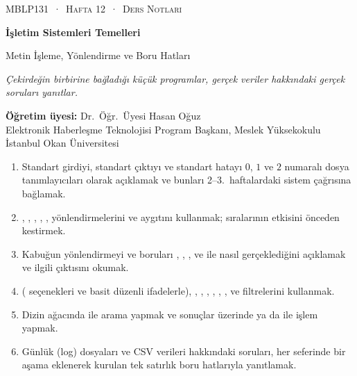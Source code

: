\setlength{\emergencystretch}{3em}
\thispagestyle{empty}
\begin{tcolorbox}[enhanced,colback=dark,colframe=dark,arc=0pt,boxrule=0pt,
  left=18pt,right=18pt,top=20pt,bottom=20pt,coltext=white]
{\small\color{mint}\textsc{MBLP131 \,·\, Hafta 12 \,·\, Ders Notları}}\par\medskip
{\headfont\fontsize{26}{30}\selectfont\bfseries İşletim Sistemleri Temelleri}\par\medskip
{\large Metin İşleme, Yönlendirme ve Boru Hatları}\par\smallskip
{\small\itshape\color{white!70} Çekirdeğin birbirine bağladığı küçük programlar, gerçek veriler hakkındaki gerçek soruları yanıtlar.}
\end{tcolorbox}

\vspace{0.4em}
\begin{minipage}[t]{0.70\linewidth}
\small
\textbf{Öğretim üyesi:} Dr.\ Öğr.\ Üyesi Hasan Oğuz\\
Elektronik Haberleşme Teknolojisi Program Başkanı, Meslek Yüksekokulu\\
İstanbul Okan Üniversitesi
\end{minipage}

\vspace{0.8em}
\begin{keyidea}
\begin{enumerate}[leftmargin=1.4em]
  \item Standart girdiyi, standart çıktıyı ve standart hatayı $0$, $1$ ve $2$ numaralı dosya tanımlayıcıları olarak açıklamak ve bunları 2--3.~haftalardaki  sistem çağrısına bağlamak.
  \item \cmd{>}, \cmd{>>}, \cmd{<}, , , \cmd{\&>} yönlendirmelerini ve  aygıtını kullanmak; sıralarının etkisini önceden kestirmek.
  \item Kabuğun yönlendirmeyi ve boruları , , ,  ve  ile nasıl gerçeklediğini açıklamak ve ilgili  çıktısını okumak.
  \item {} ( seçenekleri ve basit düzenli ifadelerle), , , , , , ,  ve  filtrelerini kullanmak.
  \item Dizin ağacında  ile arama yapmak ve sonuçlar üzerinde  ya da  ile işlem yapmak.
  \item Günlük (log) dosyaları ve CSV verileri hakkındaki soruları, her seferinde bir aşama eklenerek kurulan tek satırlık boru hatlarıyla yanıtlamak.
\end{enumerate}
\end{keyidea}


